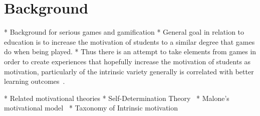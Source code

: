 \section{Background}
* Background for serious games and gamification
* General goal in relation to education is to increase the motivation of students to a similar degree that games do when being played. 
* Thus there is an attempt to take elements from games in order to create experiences that hopefully increase the motivation of students as motivation, particularly of the intrinsic variety generally is correlated with better learning outcomes~\cite{ryan2000intrinsic}. 

* Related motivational theories
    * Self-Determination Theory~\cite{ryan2000intrinsic}
    * Malone's motivational model~\cite{malone1981toward}
    * Taxonomy of Intrinsic motivation~\cite{maloneTax}